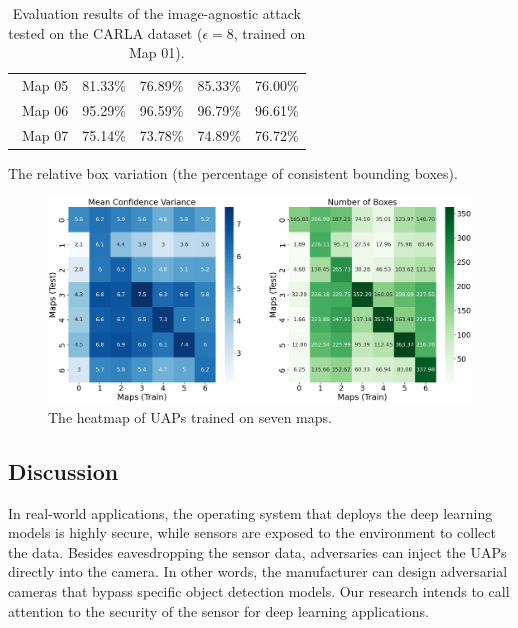 \begin{table}[H]
\begin{subtable}[t]{\textwidth}
\begin{tabular}{lccca}
        \ Map 05 & 81.33\% & 76.89\% & 85.33\% & 76.00\% \\
        \ Map 06 & 95.29\% & 96.59\% & 96.79\% & 96.61\% \\
        \ Map 07 & 75.14\% & 73.78\% & 74.89\% & 76.72\% \\
        \hline
        \end{tabular}
        \caption{The relative box variation (the percentage of consistent bounding boxes).}
        \label{tab:trans_rela_box}
    \end{subtable}
\hspace{\fill}
    \caption{Evaluation results of the image-agnostic attack tested on the CARLA dataset ($\epsilon=8$, trained on Map 01).}
    \label{tab:trans}
\end{table}

\vfill

\clearpage

\begin{figure}[H]
    \centering
    \includegraphics[width=\textwidth]{figures/chapter_detection/hardware/cor.png}
  \caption{The heatmap of UAPs trained on seven maps.}
  \label{fig:cor}
\end{figure}

\subsection{Discussion}

In real-world applications, the operating system that deploys the deep learning models is highly secure, while sensors are exposed to the environment to collect the data. Besides eavesdropping the sensor data, adversaries can inject the UAPs directly into the camera. In other words, the manufacturer can design adversarial cameras that bypass specific object detection models. Our research intends to call attention to the security of the sensor for deep learning applications. 

